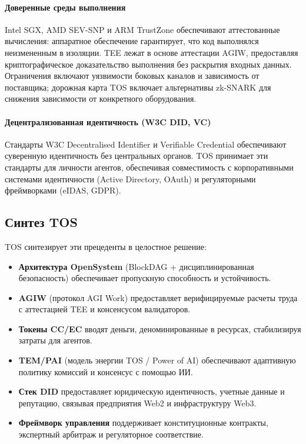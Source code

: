 \documentclass[11pt]{article}
\begin{document}
\paragraph{Доверенные среды выполнения} Intel SGX, AMD SEV-SNP и ARM TrustZone обеспечивают аттестованные вычисления: аппаратное обеспечение гарантирует, что код выполнялся неизмененным в изоляции. TEE лежат в основе аттестации AGIW, предоставляя криптографическое доказательство выполнения без раскрытия входных данных. Ограничения включают уязвимости боковых каналов и зависимость от поставщика; дорожная карта TOS включает альтернативы zk-SNARK для снижения зависимости от конкретного оборудования.

\paragraph{Децентрализованная идентичность (W3C DID, VC)} Стандарты W3C Decentralised Identifier и Verifiable Credential обеспечивают суверенную идентичность без центральных органов. TOS принимает эти стандарты для личности агентов, обеспечивая совместимость с корпоративными системами идентичности (Active Directory, OAuth) и регуляторными фреймворками (eIDAS, GDPR).

\subsection{Синтез TOS}
TOS синтезирует эти прецеденты в целостное решение:
\begin{itemize}[noitemsep]
  \item \textbf{Архитектура OpenSystem} (BlockDAG + дисциплинированная безопасность) обеспечивает пропускную способность и устойчивость.
  \item \textbf{AGIW} (протокол AGI Work) предоставляет верифицируемые расчеты труда с аттестацией TEE и консенсусом валидаторов.
  \item \textbf{Токены CC/EC} вводят деньги, деноминированные в ресурсах, стабилизируя затраты для агентов.
  \item \textbf{TEM/PAI} (модель энергии TOS / Power of AI) обеспечивают адаптивную политику комиссий и консенсус с помощью ИИ.
  \item \textbf{Стек DID} предоставляет юридическую идентичность, учетные данные и репутацию, связывая предприятия Web2 и инфраструктуру Web3.
  \item \textbf{Фреймворк управления} поддерживает конституционные контракты, экспертный арбитраж и регуляторное соответствие.
\end{itemize}
\end{document}
